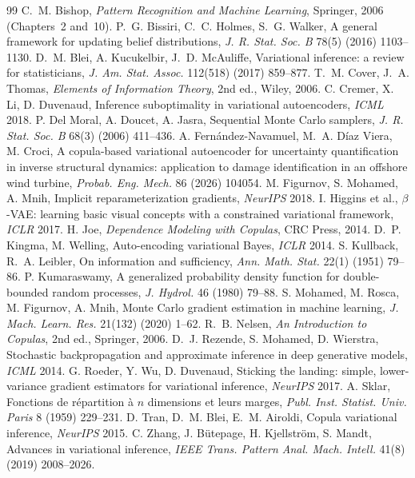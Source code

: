 \documentclass[11pt,a4paper]{article}
\numberwithin{equation}{section}
\theoremstyle{plain}
\theoremstyle{definition}
\theoremstyle{remark}
\begin{document}
\begin{thebibliography}{99}\small
{} C.~M. Bishop, \emph{Pattern Recognition and Machine Learning}, Springer, 2006 (Chapters~2 and~10).
 P.~G. Bissiri, C.~C. Holmes, S.~G. Walker, A general framework for updating belief distributions, \emph{J. R. Stat. Soc. B} 78(5) (2016) 1103--1130.
 D.~M. Blei, A. Kucukelbir, J.~D. McAuliffe, Variational inference: a review for statisticians, \emph{J. Am. Stat. Assoc.} 112(518) (2017) 859--877.
 T.~M. Cover, J.~A. Thomas, \emph{Elements of Information Theory}, 2nd ed., Wiley, 2006.
 C. Cremer, X. Li, D. Duvenaud, Inference suboptimality in variational autoencoders, \emph{ICML} 2018.
 P. Del Moral, A. Doucet, A. Jasra, Sequential Monte Carlo samplers, \emph{J. R. Stat. Soc. B} 68(3) (2006) 411--436.
 A. Fern\'andez-Navamuel, M.~A. D\'iaz Viera, M. Croci, A copula-based variational autoencoder for uncertainty quantification in inverse structural dynamics: application to damage identification in an offshore wind turbine, \emph{Probab. Eng. Mech.} 86 (2026) 104054.
 M. Figurnov, S. Mohamed, A. Mnih, Implicit reparameterization gradients, \emph{NeurIPS} 2018.
 I. Higgins et al., $\beta$-VAE: learning basic visual concepts with a constrained variational framework, \emph{ICLR} 2017.
 H. Joe, \emph{Dependence Modeling with Copulas}, CRC Press, 2014.
 D.~P. Kingma, M. Welling, Auto-encoding variational Bayes, \emph{ICLR} 2014.
 S. Kullback, R.~A. Leibler, On information and sufficiency, \emph{Ann. Math. Stat.} 22(1) (1951) 79--86.
 P. Kumaraswamy, A generalized probability density function for double-bounded random processes, \emph{J. Hydrol.} 46 (1980) 79--88.
 S. Mohamed, M. Rosca, M. Figurnov, A. Mnih, Monte Carlo gradient estimation in machine learning, \emph{J. Mach. Learn. Res.} 21(132) (2020) 1--62.
 R.~B. Nelsen, \emph{An Introduction to Copulas}, 2nd ed., Springer, 2006.
 D.~J. Rezende, S. Mohamed, D. Wierstra, Stochastic backpropagation and approximate inference in deep generative models, \emph{ICML} 2014.
 G. Roeder, Y. Wu, D. Duvenaud, Sticking the landing: simple, lower-variance gradient estimators for variational inference, \emph{NeurIPS} 2017.
 A. Sklar, Fonctions de r\'epartition \`a $n$ dimensions et leurs marges, \emph{Publ. Inst. Statist. Univ. Paris} 8 (1959) 229--231.
 D. Tran, D.~M. Blei, E.~M. Airoldi, Copula variational inference, \emph{NeurIPS} 2015.
 C. Zhang, J. B\"utepage, H. Kjellstr\"om, S. Mandt, Advances in variational inference, \emph{IEEE Trans. Pattern Anal. Mach. Intell.} 41(8) (2019) 2008--2026.
\end{thebibliography}
\end{document}

